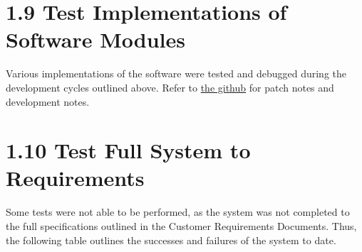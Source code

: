 \documentclass{article}
\begin{document}

\section*{1.9 Test Implementations of Software Modules}
Various implementations of the software were tested and debugged during the development cycles outlined above.  Refer to \href{https://github.com/Shamshel/ECE5770}{the github} for patch notes and development notes.


\section*{1.10 Test Full System to Requirements}
Some tests were not able to be performed, as the system was not completed to the full specifications outlined in the Customer Requirements Documents.  Thus, the following table outlines the successes and failures of the system to date.
\end{document}

